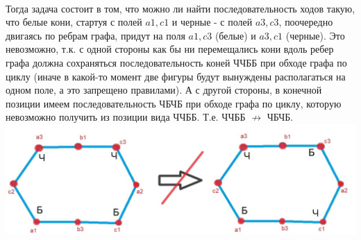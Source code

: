 \documentclass{article}
\begin{document}
\\
Тогда задача состоит в том, что можно ли найти последовательность ходов такую, что белые кони, стартуя с полей $a1,c1$ и черные - с полей $a3,c3$, поочередно двигаясь по ребрам графа, придут на поля $a1,c3$ (белые) и $a3,c1$ (черные). Это невозможно, т.к. с одной стороны как бы ни перемещались кони вдоль ребер графа должна сохраняться последовательность коней ЧЧББ при обходе графа по циклу (иначе в какой-то момент две фигуры будут вынуждены располагаться на одном поле, а это запрещено правилами). А с другой стороны, в конечной позиции имеем последовательность ЧБЧБ при обходе графа по циклу, которую невозможно получить из позиции вида ЧЧББ. Т.е. ЧЧББ  $\not \rightarrow$ ЧБЧБ.
\\
{\includegraphics[scale=0.4]{img/img6.jpg}}
\end{document}
